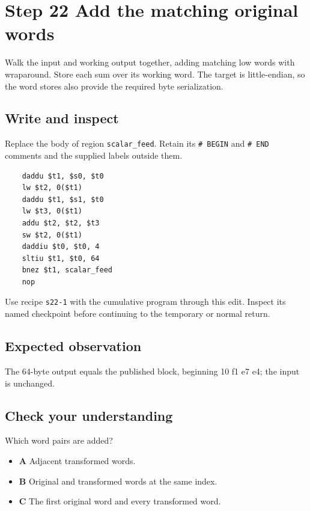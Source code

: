 \section{Step 22 Add the matching original words}\label{chacha-s22}

Walk the input and working output together, adding matching low words with wraparound. Store each sum over its working word. The target is little-endian, so the word stores also provide the required byte serialization.

\subsection{Write and inspect}
Replace the body of region \texttt{scalar\_feed}. Retain its \texttt{\# BEGIN} and \texttt{\# END} comments and the supplied labels outside them.

\begin{verbatim}
    daddu $t1, $s0, $t0
    lw $t2, 0($t1)
    daddu $t1, $s1, $t0
    lw $t3, 0($t1)
    addu $t2, $t2, $t3
    sw $t2, 0($t1)
    daddiu $t0, $t0, 4
    sltiu $t1, $t0, 64
    bnez $t1, scalar_feed
    nop
\end{verbatim}

Use recipe \texttt{s22-1} with the cumulative program through this edit. Inspect its named checkpoint before continuing to the temporary or normal return.

\subsection{Expected observation}
The 64-byte output equals the published block, beginning 10 f1 e7 e4; the input is unchanged.

\subsection{Check your understanding}
Which word pairs are added?

\begin{itemize}
  \item \textbf{A} Adjacent transformed words.
  \item \textbf{B} Original and transformed words at the same index.
  \item \textbf{C} The first original word and every transformed word.
\end{itemize}
